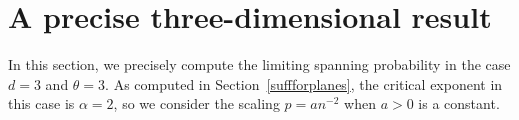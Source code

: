 \documentclass{amsart}
\newcommand{\prob}{\mathbb{P}}
\newcommand{\threshold}{\theta}
\numberwithin{equation}{section}
\newtheorem{theorem}{Theorem}[section]
\theoremstyle{definition}
\theoremstyle{remark}
\begin{document}
\section{A precise three-dimensional result}
\label{3d-precise}
In this section, we precisely compute the limiting spanning probability in the case $d=3$ and $\threshold=3$.  As computed in Section~\ref{suffforplanes}, the critical exponent in this case is $\alpha=2$, so we consider the scaling $p = a n^{-2}$ when $a>0$ is a constant.

\begin{comment}
\begin{theorem}
\label{3d-spanning-thm}
Let $d=3$, $\threshold=3$ and $p = an^{-2}$ with $a>0$.  Then as $n\to \infty$
\begin{equation}
\prob_{p}(\omega_\infty \equiv1) \to 1 - e^{-a^3 - (3/2)a^2(1-e^{-2a})}\left[\frac{3}{2} a^2\left(\left(e^{-a}+ae^{-3a}\right)^2-e^{-2a}\right)e^{-a^2e^{-2a}} + e^{a^3e^{-3a}} \right].
\end{equation}
\end{theorem}
\end{comment}
\end{document}
